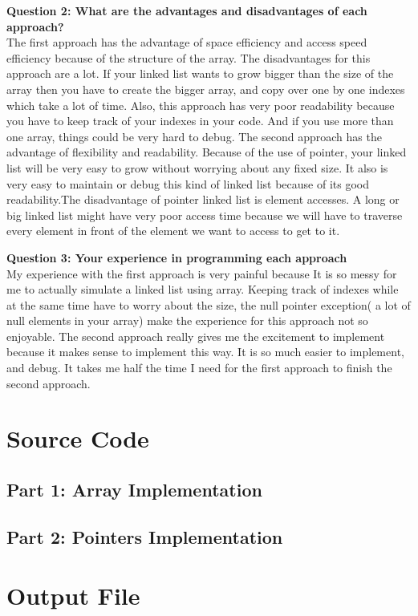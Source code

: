 \documentclass{article}
\begin{document}
\textbf{Question 2: What are the advantages and disadvantages of each
approach?}\\ The first approach has the advantage of space efficiency and access
speed efficiency because of the structure of the array. The disadvantages for this approach are a lot. If your linked list wants to grow bigger than the size of the array then you have to create the bigger array, and copy over one by one indexes which take a lot of time. Also, this approach has very poor readability because you have to keep track of your indexes in your code. And if you use more than one array, things could be very hard to debug.
	 The second approach has the advantage of flexibility and readability. Because of the use of pointer, your linked list will be very easy to grow without worrying about any fixed size. It also is very easy to maintain or debug this kind of linked list because of its good readability.The disadvantage of pointer linked list is element accesses. A long or big linked list might have very poor access time because we will have to traverse every element in front of the element we want to access to get to it.

\textbf{Question 3: Your experience in programming each approach}\\
	My experience with the first approach is very painful because It is so messy for me to actually simulate a linked list using array. Keeping track of indexes while at the same time have to worry about the size, the null pointer exception( a lot of null elements in your array) make the experience for this approach not so enjoyable.
	The second approach really gives me the excitement to implement because it makes sense to implement this way. It is so much easier to implement, and debug. It takes me half the time I need for the first approach to finish the second approach.
\newpage

\section{Source Code}
\subsection{Part 1: Array Implementation}


\subsection{Part 2: Pointers Implementation}



\newpage
\section{Output File}


\end{document}
